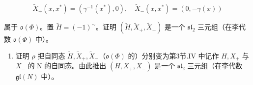 \[
\tilde {X} _ {+} (x, x ^ {*}) = (\gamma^ {- 1} (x ^ {*}), 0), \quad \tilde {X} _ {-} (x, x ^ {*}) = (0, - \gamma (x))
\]

属于 \(\mathfrak{o}(\varPhi)\)。置 \(\tilde{H} = (-1)^{\sim}\)。证明 \((\tilde{H}, \tilde{X}_{+}, \tilde{X}_{-})\) 是一个 \(\mathfrak{sl}_2\) 三元组（在李代数 \(\mathfrak{o}(\varPhi)\) 中）。

\begin{enumerate}
\def\labelenumi{\alph{enumi})}
\setcounter{enumi}{2}
\tightlist
\item
  证明 \(\rho\) 把自同态 \(\tilde{H}, \tilde{X}_{+}, \tilde{X}_{-}\)（\(\mathfrak{o}(\Phi)\) 的）分别变为第3节.IV 中记作 \(H, X_{+}\) 与 \(X_{-}\) 的 N 的自同态。由此推出 \((H, X_{+}, X_{-})\) 是一个 \(\mathfrak{sl}_{2}\) 三元组（在李代数 \(\mathfrak{gl}(N)\) 中）。
\end{enumerate}

